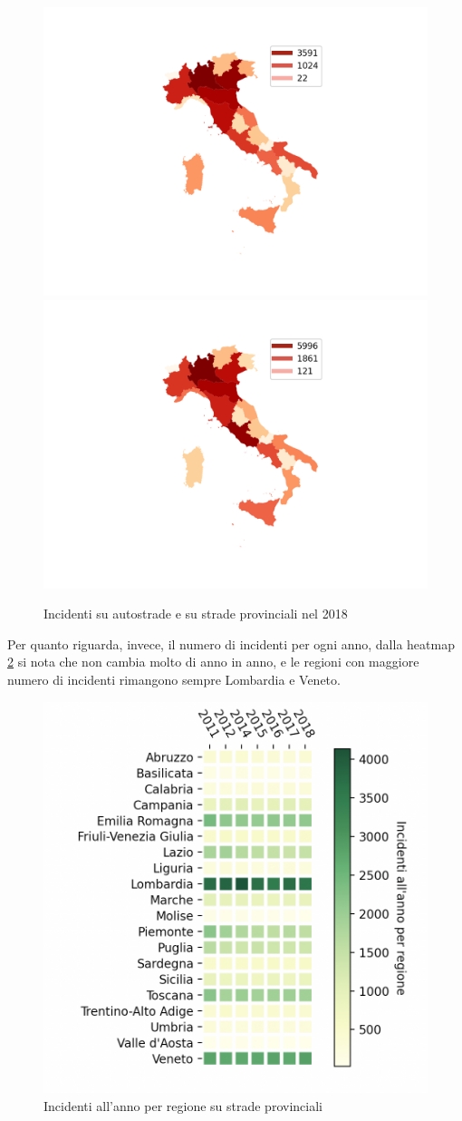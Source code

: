 \documentclass[a4paper]{report}
\begin{document}
\begin{figure}
    \includegraphics[width=0.5\linewidth]{../src/incidenti/incidenti_aci/mappe_regioni/incidenti_regione.png}
    \includegraphics[width=0.5\linewidth]{../src/incidenti/incidenti_aci/mappe_regioni/incidenti_regione_autostrade.png}
    \caption{Incidenti su autostrade e su strade provinciali nel 2018}
    \label{fig:incidenti-per-regione}
\end{figure}

Per quanto riguarda, invece, il numero di incidenti per ogni anno, 
dalla heatmap \ref{fig:regione-heatmap} 
si nota che non cambia molto di anno in anno, e le regioni con maggiore numero di incidenti rimangono 
sempre Lombardia e Veneto.

\begin{figure}
    \includegraphics[width=\linewidth]{../src/incidenti/incidenti_aci/mappe_regioni/regioni_heatmap.png}
    \caption{Incidenti all'anno per regione su strade provinciali}
    \label{fig:regione-heatmap}
\end{figure}
\end{document}
